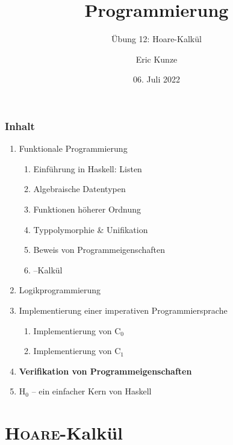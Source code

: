 \documentclass{beamer}
\begin{document}
	
	\title{Programmierung}
	\subtitle{Übung 12: Hoare-Kalkül}
	\author{Eric Kunze}
	\date{06. Juli 2022}
	
	\maketitle
	


\begin{frame}[fragile] \frametitle{Inhalt}
	\begin{enumerate}
		\item Funktionale Programmierung
		\begin{enumerate}
			\item Einführung in Haskell: Listen
			\item Algebraische Datentypen
			\item Funktionen höherer Ordnung
			\item Typpolymorphie \& Unifikation
			\item Beweis von Programmeigenschaften
			\item \textlambda--Kalkül
		\end{enumerate}
		\item Logikprogrammierung
		\item Implementierung einer imperativen Programmiersprache
		\begin{enumerate}
			\item Implementierung von C${}_\text{0}$
			\item Implementierung von C${}_\text{1}$
		\end{enumerate}
		\item \textbf{Verifikation von Programmeigenschaften}
		\item H${}_\text{0}$ -- ein einfacher Kern von Haskell
	\end{enumerate}
\end{frame}



\section{\textsc{Hoare}-Kalkül}
\end{document}
